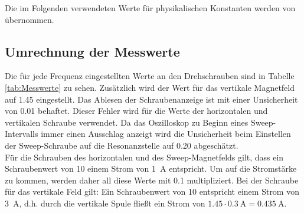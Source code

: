 Die im Folgenden verwendeten Werte für physikalischen Konstanten werden von \cite{Codata} übernommen.
\subsection{Umrechnung der Messwerte}
Die für jede Frequenz eingestellten Werte an den Drehschrauben sind in Tabelle \ref{tab:Messwerte} zu sehen. Zusätzlich wird der Wert für das vertikale Magnetfeld auf 1.45 eingestellt.
Das Ablesen der Schraubenanzeige ist mit einer Unsicherheit von 0.01 behaftet. Dieser Fehler wird für die Werte der horizontalen und vertikalen Schraube verwendet. Da das Oszilloskop zu Beginn eines Sweep-Intervalls immer einen Ausschlag anzeigt wird die Unsicherheit beim Einstellen der Sweep-Schraube auf die Resonanzstelle auf 0.20 abgeschätzt. \\
Für die Schrauben des horizontalen und des Sweep-Magnetfelds gilt, dass ein Schraubenwert von 10 einem Strom von \SI{1}{\ampere} entspricht. Um auf die Stromstärke zu kommen, werden daher all diese Werte mit 0.1 multipliziert. Bei der Schraube für das vertikale Feld gilt: Ein Schraubenwert von 10 entspricht einem Strom von \SI{3}{\ampere}, d.h. durch die vertikale Spule fließt ein Strom von $1.45\cdot \SI{0.3}{\ampere} = \SI{0.435}{\ampere}$.

